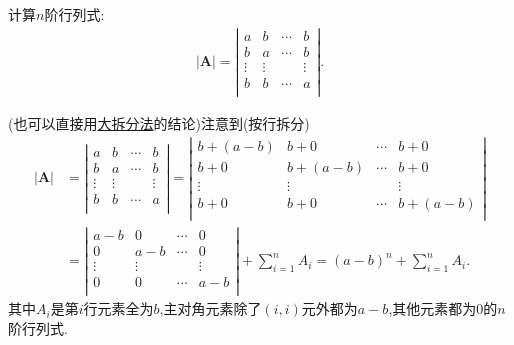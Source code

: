 \documentclass[../../main.tex]{subfiles}%
\begin{document}
\begin{proposition}\label{大/小拆分法例题1}
计算$n$阶行列式:
\begin{align*}
|\boldsymbol{A}|=\left| \begin{matrix}
a&		b&		\cdots&		b\\
b&		a&		\cdots&		b\\
\vdots&		\vdots&		&		\vdots\\
b&		b&		\cdots&		a\\
\end{matrix} \right|.
\end{align*}
\end{proposition}
\begin{solution}

{\color{blue}}
(也可以直接用\hyperref[大拆分法]{大拆分法}的结论)注意到(按行拆分)
\begin{align*}
|\boldsymbol{A}|&=\left| \begin{matrix}
a&		b&		\cdots&		b\\
b&		a&		\cdots&		b\\
\vdots&		\vdots&		&		\vdots\\
b&		b&		\cdots&		a\\
\end{matrix} \right|=\left| \begin{matrix}
b+\left( a-b \right)&		b+0&		\cdots&		b+0\\
b+0&		b+\left( a-b \right)&		\cdots&		b+0\\
\vdots&		\vdots&		&		\vdots\\
b+0&		b+0&		\cdots&		b+\left( a-b \right)\\
\end{matrix} \right|
\\
&=\left| \begin{matrix}
a-b&		0&		\cdots&		0\\
0&		a-b&		\cdots&		0\\
\vdots&		\vdots&		&		\vdots\\
0&		0&		\cdots&		a-b\\
\end{matrix} \right|+\sum_{i=1}^n{A_i}=\left( a-b \right) ^n+\sum_{i=1}^n{A_i}.
\end{align*}
其中$A_i$是第$i$行元素全为$b$,主对角元素除了$( i,i )$元外都为$a-b$,其他元素都为0的$n$阶行列式.


\end{solution}
\end{document}
